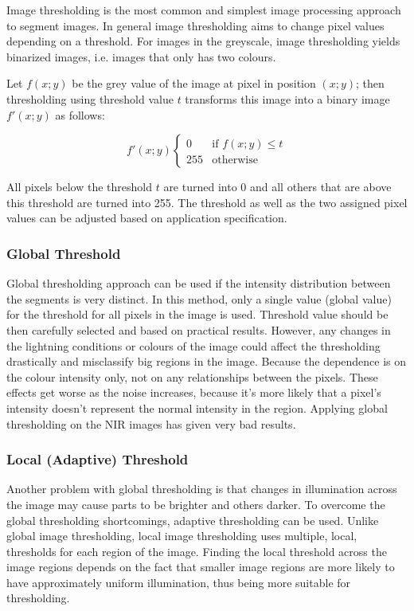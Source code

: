Image thresholding is the most common and simplest image processing approach to segment images. In general image thresholding aims to change pixel values depending on a threshold. For images in the greyscale, image thresholding yields binarized images, i.e. images that only has two colours. 

Let $f(x; y)$ be the grey value of the image at pixel in position $(x; y)$; then thresholding using threshold value $t$ transforms this image into a binary image $f'(x; y)$ as follows:

\begin{equation}
\mathcal{} f'(x; y)
  \begin{cases}
    0 & \text{if $f(x; y) \leq t$} \\

    255 & \text{otherwise}
  \end{cases}
\end{equation}

All pixels below the threshold $t$ are turned into 0 and all others that are above this threshold are turned into 255. The threshold as well as the two assigned pixel values can be adjusted based on application specification.

\subsubsection{Global Threshold}
Global thresholding approach can be used if the intensity distribution between the segments is very distinct. In this method, only a single value (global value) for the threshold for all pixels in the image is used. Threshold value should be then carefully selected and based on practical results. However, any changes in the lightning conditions or colours of the image could affect the thresholding drastically and misclassify big regions in the image. Because the dependence is on the colour intensity only, not on any relationships between the pixels. These effects get worse as the noise increases, because it’s more likely that a pixel’s intensity doesn’t represent the normal intensity in the region. 
Applying global thresholding on the NIR images has given very bad results. 

\subsubsection{Local (Adaptive) Threshold}
Another problem with global thresholding is that changes in illumination across the image may cause parts to be brighter and others darker. To overcome the global thresholding shortcomings, adaptive thresholding can be used. 
Unlike global image thresholding, local image thresholding uses multiple, local, thresholds for each region of the image. Finding the local threshold across the image regions depends on the fact that smaller image regions are more likely to have approximately uniform illumination, thus being more suitable for thresholding.


